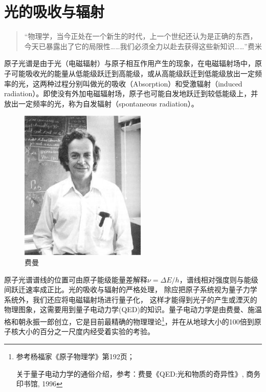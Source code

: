 \section{光的吸收与辐射}

\begin{quotation}
``物理学，当今正处在一个新生的时代，上一个世纪还认为是正确的东西，
今天已暴露出了它的局限性……我们必须全力以赴去获得这些新知识……''\qquad 费米
\end{quotation}

原子光谱是由于光（电磁辐射）与原子相互作用产生的现象，在电磁辐射场中，原子可能吸收光的能量从低能级跃迁到高能级，或从高能级跃迁到低能级放出一定频率的光，这两种过程分别叫做光的吸收（Absorption）和受激辐射（induced radiation）。即使没有外加电磁辐射场，原子也可能自发地跃迁到较低能级上，并放出一定频率的光，称为自发辐射（spontaneous radiation）。

\begin{figure}[h]
\begin{center}
\includegraphics[clip,width=6cm]{Perturbation/feynman.ps}
\caption{费曼}
\end{center}
\end{figure}

原子光谱谱线的位置可由原子能级能量差解释$\nu  = \Delta E/h$，谱线相对强度则与能级间跃迁速率成正比。光的吸收与辐射的严格处理，
除应把原子系统视为量子力学系统外，我们还应将电磁辐射场进行量子化，
这样才能得到光子的产生或湮灭的物理图象，这需要用到量子电动力学(QED)的知识。量子电动力学是由费曼、施温格和朝永振一郎创立，它是目前最精确的物理理论\footnote{参考杨福家《原子物理学》第192页；

关于量子电动力学的通俗介绍，参考：费曼《QED:光和物质的奇异性》, 商务印书馆, 1996}，并在从地球大小的100倍到原子核大小的百分之一尺度内经受着实验的考验。


